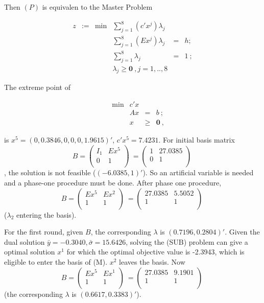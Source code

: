 Then $(P)$ is equivalen to the Master Problem

\[
\tag{$M$}
\begin{array}{ccrrcl}
z & := & \min & \sum_{j=1}^8 (c'x^j)\lambda_j  &      &   \\
   &&   &  \sum_{j=1}^8 (Ex^j)\lambda_j  & = & h; \\
   &&   &  \sum_{j=1}^8 \lambda_j &   =  & 1~; \\
   &&   &   \lambda_j \geq \mathbf{0}~,j=1,..,8 &&
\end{array}
\]

The extreme point of 

\[
\tag{$P'$}
\begin{array}{ccrrcl}
 & & \min & c'x  &      &   \\
   &&   &  Ax  &   =  & b~; \\
   &&   &   x  & \geq & \mathbf{0}~,
\end{array}
\]

is $x^5=(0,0.3846,0,0,0,1.9615)'$, $c'x^5 = 7.4231$. For initial basis matrix $$B = \left(
  \begin{array}{cc}
     I_1 & Ex^5 \\
    0 & 1\\
  \end{array}
\right)~ =  \left(
  \begin{array}{cc}
     1 & 27.0385 \\
    0 & 1\\
  \end{array}
\right)~$$, the solution is not feasible ($(-6.0385,1)'$). So an artificial variable is needed and a phase-one procedure must be done. After phase one procedure, $$B = \left(
  \begin{array}{cc}
     Ex^5 & Ex^2 \\
    1 & 1\\
  \end{array}
\right)~ =  \left(
  \begin{array}{cc}
      27.0385 & 5.5052 \\
    1 & 1\\
  \end{array}
\right)~$$ ($\lambda_2$ entering the basis).

For the first round, given $B$, the corresponding $\lambda$ is $(0.7196,0.2804)'$. Given the dual solution $\bar{y} = -0.3040, \bar{\sigma} = 15.6426$, solving the (SUB) problem can give a optimal solution $x^1$ for which the optimal objective value is -2.3943, which is eligible to enter the basis of (M). $x^2$ leaves the basis. Now$$B = \left(
  \begin{array}{cc}
     Ex^5 & Ex^1 \\
    1 & 1\\
  \end{array}
\right)~ =  \left(
  \begin{array}{cc}
      27.0385 & 9.1901 \\
    1 & 1\\
  \end{array}
\right)~$$ (the corresponding $\lambda$ is $(0.6617,0.3383)'$).

